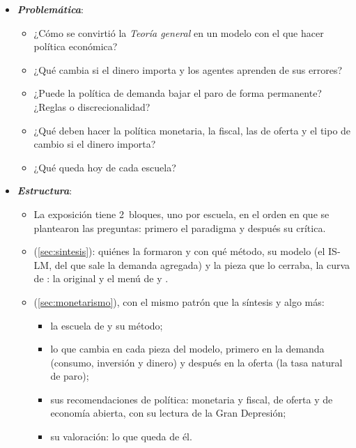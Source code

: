 \documentclass[11pt]{article}
\begin{document}
\begin{itemize}
\begin{itemize}
\begin{itemize}
    \item la de los \emph{keynesianos del desequilibrio} (, , ), para quienes la síntesis olvida que  es una teoría del desequilibrio ;
    \item la \emph{monetarista}, encabezada por : la síntesis había olvidado el dinero, confiaba demasiado en la política discrecional e ignoraba las expectativas. Fue la que más influyó en la política económica, y es la de esta exposición.
    \end{itemize}
  \end{itemize}

\item \textbf{\emph{Problemática}}:
  \begin{itemize}
  \item ¿Cómo se convirtió la \emph{Teoría general} en un modelo con el que hacer política económica?
  \item ¿Qué cambia si el dinero importa y los agentes aprenden de sus errores?
  \item ¿Puede la política de demanda bajar el paro de forma permanente? ¿Reglas o discrecionalidad?
  \item ¿Qué deben hacer la política monetaria, la fiscal, las de oferta y el tipo de cambio si el dinero importa?
  \item ¿Qué queda hoy de cada escuela?
  \end{itemize}

\item \textbf{\emph{Estructura}}:
  \begin{itemize}
  \item La exposición tiene 2~bloques, uno por escuela, en el orden en que se plantearon las preguntas: primero el paradigma y después su crítica.
  \item {} (\ref{sec:sintesis}): quiénes la formaron y con qué método, su modelo (el IS-LM, del que sale la demanda agregada) y la pieza que lo cerraba, la curva de : la original y el menú de  y .
  \item {} (\ref{sec:monetarismo}), con el mismo patrón que la síntesis y algo más:
    \begin{itemize}
    \item la escuela de  y su método;
    \item lo que cambia en cada pieza del modelo, primero en la demanda (consumo, inversión y dinero) y después en la oferta (la tasa natural de paro);
    \item sus recomendaciones de política: monetaria y fiscal, de oferta y de economía abierta, con su lectura de la Gran Depresión;
    \item su valoración: lo que queda de él.
    \end{itemize}
  \end{itemize}
\end{itemize}
\end{document}
